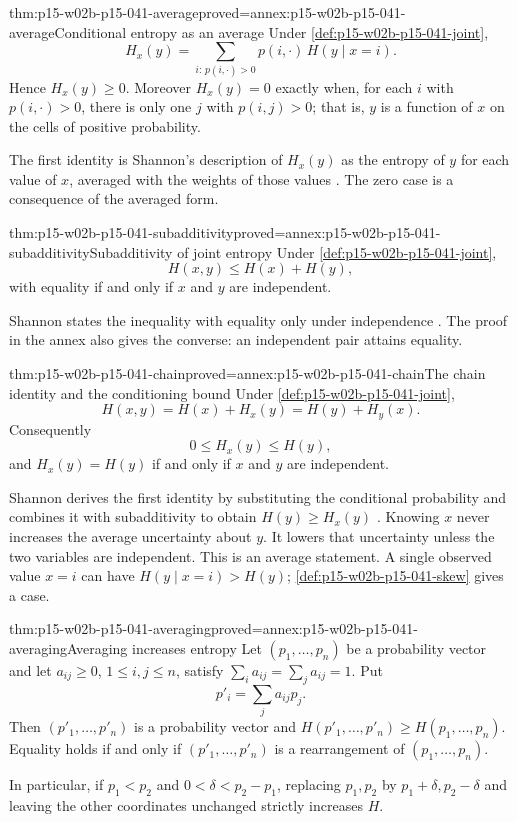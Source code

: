 \begin{hbtheorem}{thm:p15-w02b-p15-041-average}{proved=annex:p15-w02b-p15-041-average}{Conditional entropy as an average}
Under \cref{def:p15-w02b-p15-041-joint},
\[
 H_x(y)=\sum_{i:\,p(i,\cdot)>0}p(i,\cdot)\,H(y\mid x=i).
\]
Hence \(H_x(y)\geq0\). Moreover \(H_x(y)=0\) exactly when, for each
\(i\) with \(p(i,\cdot)>0\), there is only one \(j\) with
\(p(i,j)>0\); that is, \(y\) is a function of \(x\) on the cells of
positive probability.
\end{hbtheorem}

The first identity is Shannon's description of \(H_x(y)\) as the
entropy of \(y\) for each value of \(x\), averaged with the weights of
those values \cite[p.~12]{Shannon1948MathematicalTheory}. The zero case
is a consequence of the averaged form.

\begin{hbtheorem}{thm:p15-w02b-p15-041-subadditivity}{proved=annex:p15-w02b-p15-041-subadditivity}{Subadditivity of joint entropy}
Under \cref{def:p15-w02b-p15-041-joint},
\[
 H(x,y)\leq H(x)+H(y),
\]
with equality if and only if \(x\) and \(y\) are independent.
\end{hbtheorem}

Shannon states the inequality with equality only under independence
\cite[p.~12]{Shannon1948MathematicalTheory}. The proof in the annex also
gives the converse: an independent pair attains equality.

\begin{hbtheorem}{thm:p15-w02b-p15-041-chain}{proved=annex:p15-w02b-p15-041-chain}{The chain identity and the conditioning bound}
Under \cref{def:p15-w02b-p15-041-joint},
\[
 H(x,y)=H(x)+H_x(y)=H(y)+H_y(x).
\]
Consequently
\[
 0\leq H_x(y)\leq H(y),
\]
and \(H_x(y)=H(y)\) if and only if \(x\) and \(y\) are independent.
\end{hbtheorem}

Shannon derives the first identity by substituting the conditional
probability and combines it with subadditivity to obtain
\(H(y)\geq H_x(y)\) \cite[p.~12]{Shannon1948MathematicalTheory}.
Knowing \(x\) never increases the average uncertainty about \(y\).
It lowers that uncertainty unless the two variables are independent.
This is an average statement. A single observed value \(x=i\) can have
\(H(y\mid x=i)>H(y)\); \cref{def:p15-w02b-p15-041-skew} gives a case.

\begin{hbtheorem}{thm:p15-w02b-p15-041-averaging}{proved=annex:p15-w02b-p15-041-averaging}{Averaging increases entropy}
Let \((p_1,\ldots,p_n)\) be a probability vector and let
\(a_{ij}\geq0\), \(1\leq i,j\leq n\), satisfy
\(\sum_ia_{ij}=\sum_ja_{ij}=1\). Put
\[
 p'_i=\sum_ja_{ij}p_j .
\]
Then \((p'_1,\ldots,p'_n)\) is a probability vector and
\(H(p'_1,\ldots,p'_n)\geq H(p_1,\ldots,p_n)\). Equality holds if and
only if \((p'_1,\ldots,p'_n)\) is a rearrangement of
\((p_1,\ldots,p_n)\).

In particular, if \(p_1<p_2\) and \(0<\delta<p_2-p_1\), replacing
\(p_1,p_2\) by \(p_1+\delta,p_2-\delta\) and leaving the other
coordinates unchanged strictly increases \(H\).
\end{hbtheorem}

